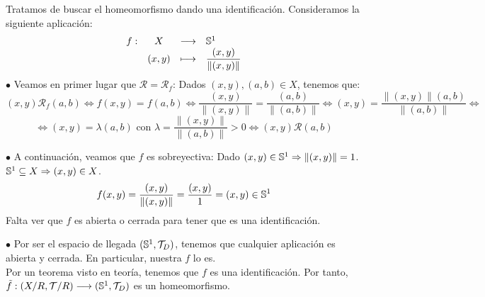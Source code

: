 \documentclass[12pt]{article}
\begin{document}
\begin{ejercicio}[4.5 puntos]
\begin{enumerate}[label=(\alph*)]
                \noindent
                Tratamos de buscar el homeomorfismo dando una identificación. Consideramos la siguiente aplicación:
                $$\begin{array}{cccl}
                    f: & X & \longrightarrow & \mathbb{S}^1 \\
                       & (x,y) & \longmapsto & \dfrac{(x,y)}{\|(x,y)\|}
                \end{array}$$
                $\bullet$ Veamos en primer lugar que $\mathcal{R} = \mathcal{R}_f$:\newline
                Dados $(x,y), (a,b) \in X$, tenemos que:
                $$(x,y)\mathcal{R}_f(a,b) \Leftrightarrow f(x,y) = f(a,b) \Leftrightarrow \dfrac{(x,y)}{\|(x,y)\|} = \dfrac{(a,b)}{\|(a,b)\|}\Leftrightarrow (x,y) = \dfrac{\|(x,y)\|(a,b)}{\|(a,b)\|} \Leftrightarrow$$
                $$\Leftrightarrow (x,y) = \lambda (a,b) \mbox{ con } \lambda = \dfrac{\|(x,y)\|}{\|(a,b)\|}>0 \Leftrightarrow (x,y)\mathcal{R}(a,b)$$

                \noindent
                $\bullet$ A continuación, veamos que $f$ es sobreyectiva:\newline
                Dado $(x,y) \in \mathbb{S}^1 \Rightarrow \|(x,y)\| = 1$. $\mathbb{S}^1 \subseteq X \Rightarrow (x,y) \in X$.
                $$f(x,y) = \dfrac{(x,y)}{\|(x,y)\|} = \dfrac{(x,y)}{1} = (x,y) \in \mathbb{S}^1$$
                Falta ver que $f$ es abierta o cerrada para tener que es una identificación.

                \noindent
                $\bullet$ Por ser el espacio de llegada $(\mathbb{S}^1, \mathcal{T}_D)$, tenemos que cualquier aplicación es abierta y cerrada. En particular, nuestra $f$ lo es.\\

                \noindent
                Por un teorema visto en teoría, tenemos que $f$ es una identificación. Por tanto, $\tilde{f}:(X/R, \mathcal{T}/R) \longrightarrow (\mathbb{S}^1, \mathcal{T}_D) $ es un homeomorfismo.


        \end{enumerate}
    \end{ejercicio}
        
\end{document}
